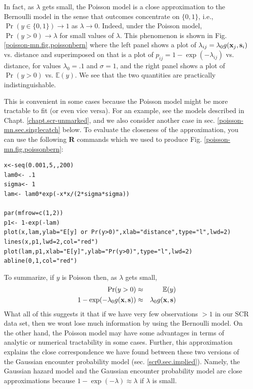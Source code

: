 In fact, as $\lambda$ gets small, the Poisson model is a close
approximation to the Bernoulli model in the sense that outcomes
concentrate on $\{0,1\}$, i.e., $\Pr(y\in \{0,1\}) \rightarrow 1$ as
$\lambda \rightarrow 0$.  Indeed, under the Poisson model, $\Pr(y>0)
\rightarrow \lambda$ for small values of $\lambda$.  This phenomenon
is shown in Fig.  \ref{poisson-mn.fig.poissonbern} where the left
panel shows a plot of $\lambda_{ij}=\lambda_{0}g({\bf x}_{j},{\bf
  s}_{i})$ vs. distance and superimposed on that is a plot of
$p_{ij}=1-\exp(-\lambda_{ij})$ vs. distance, for values $\lambda_{0} =
.1$ and $\sigma = 1$, and the right panel shows a plot of $\Pr(y>0)$
vs. $\mathbb{E}(y)$. We see that the two quantities are practically
indistinguishable.

This is convenient in some cases because the Poisson model might be
more tractable to fit (or even vice versa). For an example, see the
models described in Chapt. \ref{chapt.scr-unmarked}, and we also
consider another case in sec. \ref{poisson-mn.sec.singlecatch}
below. To evaluate the closeness of the approximation, you can use the
following {\bf R} commands which we used to produce
Fig. \ref{poisson-mn.fig.poissonbern}: 
{\small
\begin{verbatim}
x<-seq(0.001,5,,200)
lam0<- .1
sigma<- 1
lam<- lam0*exp(-x*x/(2*sigma*sigma))

par(mfrow=c(1,2))
p1<- 1-exp(-lam)
plot(x,lam,ylab="E[y] or Pr(y>0)",xlab="distance",type="l",lwd=2)
lines(x,p1,lwd=2,col="red")
plot(lam,p1,xlab="E[y]",ylab="Pr(y>0)",type="l",lwd=2)
abline(0,1,col="red")
\end{verbatim}
}

To summarize, if $y$ is Poisson then, as $\lambda$ gets small,
\begin{eqnarray*}
\Pr(y>0)  & \approx & \mathbb{E}(y)  \\
1-\exp(-\lambda_{0} g({\bf x},{\bf s})) &\approx &  \lambda_{0} g({\bf
  x},{\bf s})
\label{poisson-mn.eq.cloglog-inverse}
\end{eqnarray*}
What all of this suggests it that if we have very few observations
$>1$ in our SCR data set, then we wont lose much information by using
the Bernoulli model. On the other hand, the Poisson model may have
some advantages in terms of analytic or numerical tractability in some
cases. Further, this approximation explains the close correspondence
we have found between these two versions of the Gaussian encounter
probability model (sec. \ref{scr0.sec.implied}).  Namely, the Gaussian
hazard model and the Gaussian encounter probability model are close
approximations because $1-\exp(-\lambda) \approx \lambda$ if $\lambda$
is small.



